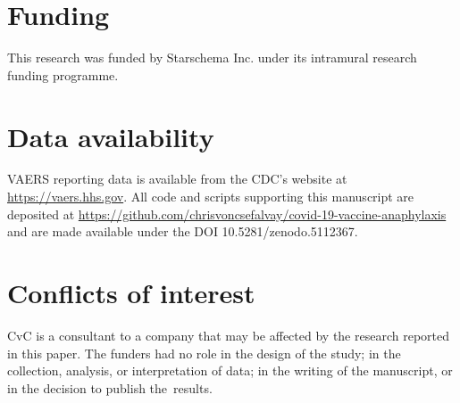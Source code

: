 \documentclass{article}
\begin{document}
\section*{Funding}

This research was funded by Starschema Inc. under its intramural research funding programme.

\section*{Data availability}

VAERS reporting data is available from the CDC's website at \url{https://vaers.hhs.gov}.
All code and scripts supporting this manuscript are deposited at
\url{https://github.com/chrisvoncsefalvay/covid-19-vaccine-anaphylaxis} and are made available under the DOI 10.5281/zenodo.5112367.

\section*{Conflicts of interest}

CvC is a consultant to a company that may be affected by the research reported in this paper.
The funders had no role in the design of the study;
in the collection, analysis, or interpretation of data;
in the writing of the manuscript, or in the decision to publish the~results.


\end{document}
